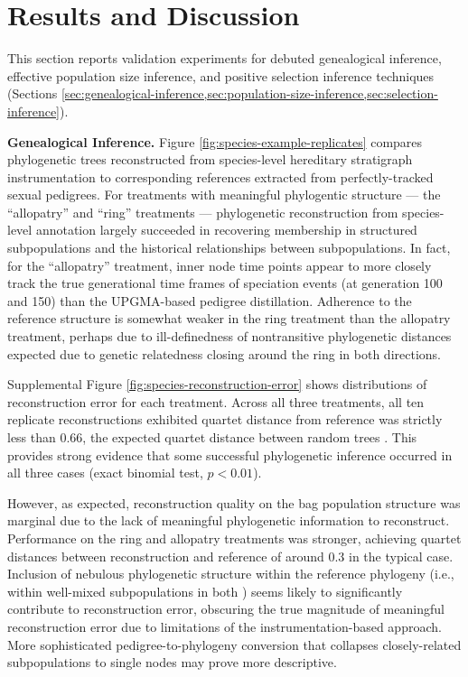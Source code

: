 \section{Results and Discussion} \label{sec:results}

This section reports validation experiments for debuted genealogical inference, effective population size inference, and positive selection inference techniques (Sections \ref{sec:genealogical-inference,sec:population-size-inference,sec:selection-inference}).


\textbf{Genealogical Inference.}
Figure \ref{fig:species-example-replicates} compares phylogenetic trees reconstructed from species-level hereditary stratigraph instrumentation to corresponding references extracted from perfectly-tracked sexual pedigrees.
For treatments with meaningful phylogentic structure --- the ``allopatry'' and ``ring'' treatments --- phylogenetic reconstruction from species-level annotation largely succeeded in recovering membership in structured subpopulations and the historical relationships between subpopulations.
In fact, for the ``allopatry'' treatment, inner node time points appear to more closely track the true generational time frames of speciation events (at generation 100 and 150) than the UPGMA-based pedigree distillation.
Adherence to the reference structure is somewhat weaker in the ring treatment than the allopatry treatment, perhaps due to ill-definedness of nontransitive phylogenetic distances expected due to genetic relatedness closing around the ring in both directions.

Supplemental Figure \ref{fig:species-reconstruction-error} shows distributions of reconstruction error for each treatment.
Across all three treatments, all ten replicate reconstructions exhibited quartet distance from reference was strictly less than 0.66, the expected quartet distance between random trees \citep{smith2020information}.
This provides strong evidence that some successful phylogenetic inference occurred in all three cases (exact binomial test, $p < 0.01$).

However, as expected, reconstruction quality on the bag population structure was marginal due to the lack of meaningful phylogenetic information to reconstruct.
Performance on the ring and allopatry treatments was stronger, achieving quartet distances between reconstruction and reference of around 0.3 in the typical case.
Inclusion of nebulous phylogenetic structure within the reference phylogeny (i.e., within well-mixed subpopulations in both ) seems likely to significantly contribute to reconstruction error, obscuring the true magnitude of meaningful reconstruction error due to limitations of the instrumentation-based approach.
More sophisticated pedigree-to-phylogeny conversion that collapses closely-related subpopulations to single nodes may prove more descriptive.

